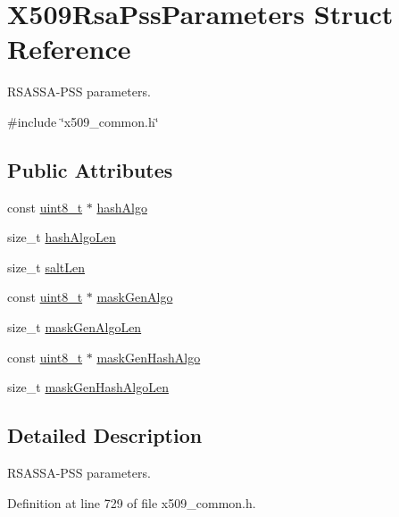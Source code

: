 \hypertarget{structX509RsaPssParameters}{}\section{X509\+Rsa\+Pss\+Parameters Struct Reference}
\label{structX509RsaPssParameters}


R\+S\+A\+S\+S\+A-\/\+P\+SS parameters.  




{\ttfamily \#include \char`\"{}x509\+\_\+common.\+h\char`\"{}}

\subsection*{Public Attributes}
\begin{DoxyCompactItemize}
\item 
const \hyperlink{stdint_8h_aba7bc1797add20fe3efdf37ced1182c5}{uint8\+\_\+t} $\ast$ \hyperlink{structX509RsaPssParameters_a21f002c671582b73f60617bc23116db3}{hash\+Algo}
\item 
size\+\_\+t \hyperlink{structX509RsaPssParameters_a91b731f749a7d1bfafbb8595f898ff2e}{hash\+Algo\+Len}
\item 
size\+\_\+t \hyperlink{structX509RsaPssParameters_a0472b015828361df56b2550e4c1ac220}{salt\+Len}
\item 
const \hyperlink{stdint_8h_aba7bc1797add20fe3efdf37ced1182c5}{uint8\+\_\+t} $\ast$ \hyperlink{structX509RsaPssParameters_a7f95c185598c0a6b7e69400d96898967}{mask\+Gen\+Algo}
\item 
size\+\_\+t \hyperlink{structX509RsaPssParameters_a212c882582b2c33fff6206a7a8872b7d}{mask\+Gen\+Algo\+Len}
\item 
const \hyperlink{stdint_8h_aba7bc1797add20fe3efdf37ced1182c5}{uint8\+\_\+t} $\ast$ \hyperlink{structX509RsaPssParameters_aee2673db47b0dce26a8bc9e2c2a51942}{mask\+Gen\+Hash\+Algo}
\item 
size\+\_\+t \hyperlink{structX509RsaPssParameters_a10553f3c1ae38188028f4dbd33f5fb8a}{mask\+Gen\+Hash\+Algo\+Len}
\end{DoxyCompactItemize}


\subsection{Detailed Description}
R\+S\+A\+S\+S\+A-\/\+P\+SS parameters. 

Definition at line 729 of file x509\+\_\+common.\+h.



